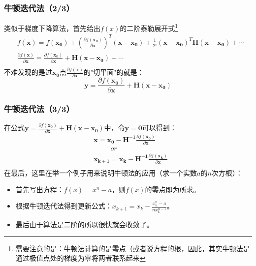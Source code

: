 \documentclass{beamer}
\begin{document}
\begin{frame}\frametitle{牛顿迭代法（2/3）}
类似于梯度下降算法，首先给出$f(x)$的二阶泰勒展开式\footnote{\color{red}需要注意的是：牛顿法计算的是零点（或者说方程的根，因此，其实牛顿法是通过极值点处的梯度为零将两者联系起来}
\begin{equation}
\label{Newton_Method_Taylor}
\begin{split}
&f(\bm{x})=f(\bm{x_0})+\left(\frac{\partial f(\bm{x_0})}{\partial \bm{x}}\right)^{T}(\bm{x-x_0})+\frac{1}{2!}(\bm{x-x_0})^{T}\bm{H}(\bm{x-x_0})+\cdots\\
&\frac{\partial f(\bm{x})}{\partial \bm{x}}=\frac{\partial f(\bm{x_0})}{\partial \bm{x}}+\bm{H}(\bm{x-x_0})+\cdots\\
\end{split}
\end{equation}
不难发现的是过$\bm{x_0}$点$\frac{\partial f(\bm{x})}{\partial \bm{x}}$的"切平面"的就是：
\begin{equation}
\label{Newton_Method_Tangent}
\bm{y}=\frac{\partial f(\bm{x_0})}{\partial \bm{x}}+\bm{H}(\bm{x-x_0})
\end{equation}
\end{frame}
\begin{frame}\frametitle{牛顿迭代法（3/3）}
在公式$\bm{y}=\frac{\partial f(\bm{x_0})}{\partial \bm{x}}+\bm{H}(\bm{x-x_0})$中，令$\bm{y=0}$可以得到：
\begin{equation}
\label{Newton_Method}
\begin{split}
&\bm{x}=\bm{x_0}-\bm{H^{-1}}\frac{\partial f(\bm{x_0})}{\partial \bm{x}}\\
&~~~~~~~~~~~or\\
&\bm{x_{k+1}}=\bm{x_k}-\bm{H^{-1}}\frac{\partial f(\bm{x_k})}{\partial \bm{x}}\\
\end{split}
\end{equation}
在最后，这里在举一个例子用来说明牛顿法的应用（求一个实数$a$的$n$次方根）：
\begin{itemize}
\item 首先写出方程：$f(x)=x^{n}-a$，则$f(x)$的零点即为所求。
\item 根据牛顿迭代法得到更新公式：$x_{k+1}=x_{k}-\frac{x_{k}^{n}-a}{nx_{k}^{n-1}}$。
\item 最后由于算法是二阶的所以很快就会收敛了。
\end{itemize}
\end{frame}
\end{document}
